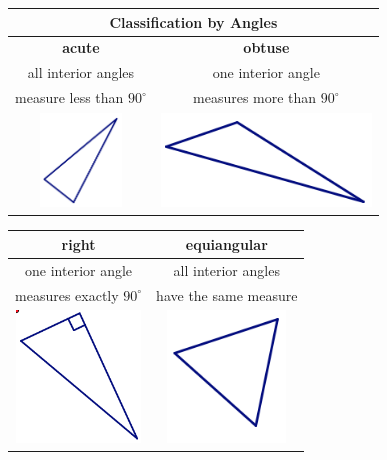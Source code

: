 \documentclass[12pt, reqno]{amsart}
\theoremstyle{remark}
\theoremstyle{definition}
\numberwithin{equation}{section}  %
\begin{document}
\begin{center}
\begin{tabular}{c|c}\hline
\multicolumn{2}{c}{\bf Classification by Angles}\\
\hline\hline
{\bf acute} & {\bf obtuse} \\
\hline
all interior angles   & one interior angle   \\
measure less than $90^\circ$ &  measures more than $90^\circ$ \\
\hline
\includegraphics[height=2.5cm]{isos} & 
\includegraphics[height=2.5cm]{scalene}  \\
\hline
\end{tabular}

\smallskip

\begin{tabular}{c|c}\hline\label{def:triangs}
{\bf right } & {\bf equiangular} \\
\hline
 one interior angle  & all interior angles \\
 measures exactly $90^\circ$ & have the same measure\\
\hline
\includegraphics[height=3.5cm]{rttri} & 
\includegraphics[height=3.5cm]{equilat}  \\
\hline
\end{tabular}

\end{center}
\end{document}
